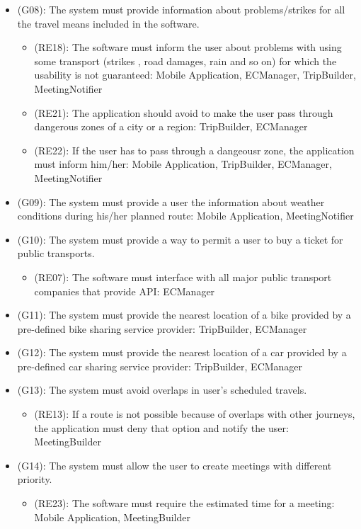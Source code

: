 \documentclass[a4paper,leqno]{article}
\begin{document}
\begin{itemize}
\begin{itemize}
	\end{itemize}
	\item (G08): The system must provide information about problems/strikes for all the travel means  included in the software.
	\begin{itemize}
		\item (RE18): The software must inform the user about problems with using some transport (strikes , road damages, rain and so on) for which the usability is not guaranteed: Mobile Application, ECManager, TripBuilder, MeetingNotifier
		\item (RE21): The application should avoid to make the user pass through dangerous zones of a city or a region: TripBuilder, ECManager
		\item (RE22): If the user has to pass through a dangeousr zone, the application must inform him/her: Mobile Application, TripBuilder, ECManager, MeetingNotifier
	\end{itemize}
	\item (G09): The system must provide a user the information about weather conditions during his/her planned route: Mobile Application, MeetingNotifier
	\item (G10): The system must provide a way to permit a user to buy a ticket for public transports.
	\begin{itemize}
		\item (RE07): The software must interface with all major public transport companies that provide API: ECManager
	\end{itemize}
	\item (G11): The system must provide the nearest location of a bike provided by a pre-defined bike sharing service provider: TripBuilder, ECManager
	\item (G12): The system must provide the nearest location of a car provided by a pre-defined car sharing service provider: TripBuilder, ECManager
	\item (G13): The system must avoid overlaps in user's scheduled travels.
	\begin{itemize}
		\item (RE13): If a route is not possible because of overlaps with other journeys, the application must deny that option and notify the user: MeetingBuilder
	\end{itemize}
	\item (G14): The system must allow the user to create meetings with different priority.
	\begin{itemize}
		\item (RE23):  The software must require the estimated time for a meeting: Mobile Application, MeetingBuilder

\end{itemize}
\end{itemize}
\end{document}

